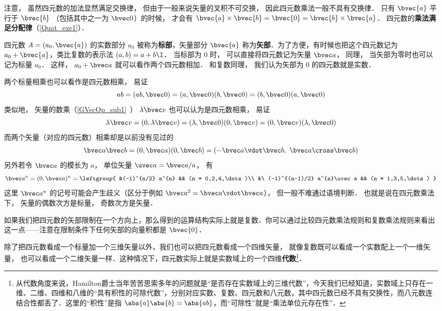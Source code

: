注意， 虽然四元数的加法显然满足交换律， 但由于一般来说矢量的叉积不可交换， 因此四元数乘法一般不具有交换律． 只有 $\bvec{a}$ 平行于 $\bvec{b}$ （包括其中之一为 $\bvec 0$）的时候， 才会有 $\bvec{a}\times\bvec{b}= \bvec{0} =\bvec{b}\times\bvec{a}$． 四元数的\textbf{乘法满足分配律}（\autoref{Quat_exe1}）．

四元数 $A=(a_0, \bvec{a})$ 的实数部分 $a_0$ 被称为\textbf{标部}，矢量部分 $\bvec{a}$ 称为\textbf{矢部}．为了方便，有时候也把这个四元数记为 $a_0+\bvec{a}$，类比复数的表示法 $(a, b)=a+b\I$． 当标部为 $0$ 时， 可以直接将四元数记为矢量 $\bvec a$， 同理， 当矢部为零时也可以记为标量 $a_0$． 这样， $a_0 + \bvec a$ 就可以看作两个四元数相加． 和复数同理， 我们认为矢部为 $0$ 的四元数就是实数．

两个标量相乘也可以看作是四元数相乘， 易证
\begin{equation}
ab = (ab, \bvec 0) = (a,\bvec 0)(b,\bvec 0) = (b,\bvec 0)(a,\bvec 0)
\end{equation}
类似地， 矢量的数乘（\autoref{GVecOp_sub1}~） $\lambda\bvec v$ 也可以认为是四元数相乘， 易证
\begin{equation}
\lambda\bvec v = (0, \lambda\bvec v) = (\lambda, \bvec 0)(0, \bvec v) = (0, \bvec v)(\lambda, \bvec 0)
\end{equation}
而两个矢量（对应的四元数）相乘却是以前没有见过的
\begin{equation}
\bvec a\bvec b = (0, \bvec a)(0, \bvec b) = (-\bvec a\vdot\bvec b,\ \bvec a\cross\bvec b)
\end{equation}
另外若令 $\bvec a$ 的模长为 $a$， 单位矢量 $\uvec a = \bvec a/a$， 有
\begin{equation}
\bvec a^{n} = (0, \bvec a)^{n} =
\leftgroup{
&(-1)^{n/2} a^{n} && (n = 0,2,4,\dots)\\
&\ (-1)^{(n-1)/2} a^{n}\uvec a && (n = 1,3,5,\dots)
}
\end{equation}
这里 $\bvec a^{n}$ 的记号可能会产生歧义（区分于例如 $\bvec a^2 = \bvec a\vdot\bvec a$）， 但一般不难通过语境判断． 也就是说在四元数乘法下， 矢量的偶数次方是标量， 奇数次方是矢量．

如果我们把四元数的矢部限制在一个方向上，那么得到的运算结构实际上就是复数．你可以通过比较四元数乘法规则和复数乘法规则来看出这一点——注意在限制条件下任何矢部的向量积都是 $\bvec{0}$．

除了把四元数看成一个标量加一个三维矢量以外，我们也可以把四元数看成一个四维矢量， 就像复数既可以看成一个实数配上一个一维矢量， 也可以看成一个二维矢量一样．这种情况下，四元数实际上就是实数域上的一个四维\textbf{代数}\footnote{从代数角度来说，Hamilton爵士当年苦苦思索多年的问题就是“是否存在实数域上的三维代数”，今天我们已经知道，实数域上只存在一维、二维、四维和八维的“具有积性的可除代数”，分别对应实数、复数、四元数和八元数，其中四元数已经不具有交换性，而八元数连结合性都丢了．这里的“积性”是指 $\abs{a}\abs{b}=\abs{ab}$，而“可除性”就是“乘法单位元存在性”．}．

